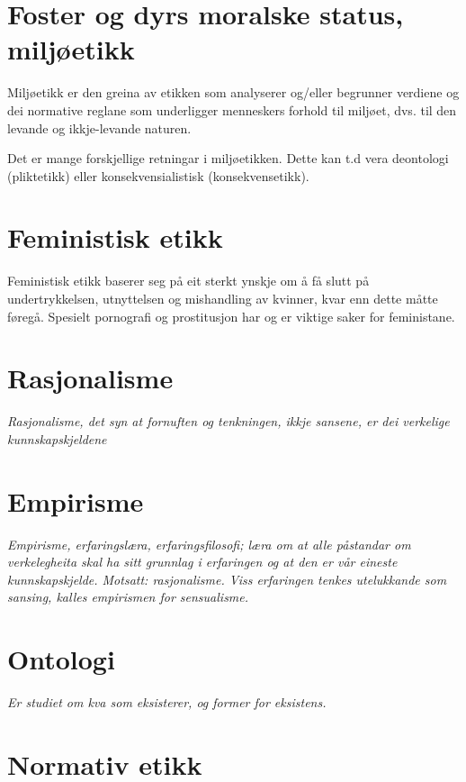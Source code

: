 \documentclass[a4paper]{IEEEtran}
\begin{document}
\section{Foster og dyrs moralske status, miljøetikk}
\label{fdms}\bigskip

Miljøetikk er den greina av etikken som analyserer og/eller begrunner verdiene og dei normative reglane som underligger menneskers forhold til miljøet, dvs. til den levande og ikkje-levande naturen.\bigskip

Det er mange forskjellige retningar i miljøetikken. Dette kan t.d vera deontologi (pliktetikk) eller konsekvensialistisk (konsekvensetikk). 

\section{Feministisk etikk}
\label{femimisme}\bigskip

Feministisk etikk baserer seg på eit sterkt ynskje om å få slutt på undertrykkelsen, utnyttelsen og mishandling av kvinner, kvar enn dette måtte føregå. Spesielt pornografi og prostitusjon har og er viktige saker for feministane. 

\section{Rasjonalisme}
\label{rasjonalisme}\bigskip

\textit{Rasjonalisme, det syn at fornuften og tenkningen, ikkje sansene, er dei verkelige kunnskapskjeldene}

\section{Empirisme}
\label{empirisme}\bigskip

\textit{Empirisme, erfaringslæra, erfaringsfilosofi; læra om at alle påstandar om verkelegheita skal ha sitt grunnlag i erfaringen og at den er vår eineste kunnskapskjelde. Motsatt: rasjonalisme. Viss erfaringen tenkes utelukkande som sansing, kalles empirismen for sensualisme.}
\section{Ontologi}
\label{ontolog}\bigskip

\textit{Er studiet om kva som eksisterer, og former for eksistens.}
\bigskip

\section{Normativ etikk}
\label{normativetikk}\bigskip
\end{document}
